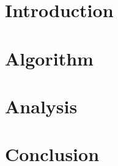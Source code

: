 


\maketitle
\section{Introduction}
\label{sec:introduction}

\section{Algorithm}
\label{sec:algorithm}

\section{Analysis}
\label{sec:analysis}

\section{Conclusion}
\label{sec:conclusion}

\printbibliography

